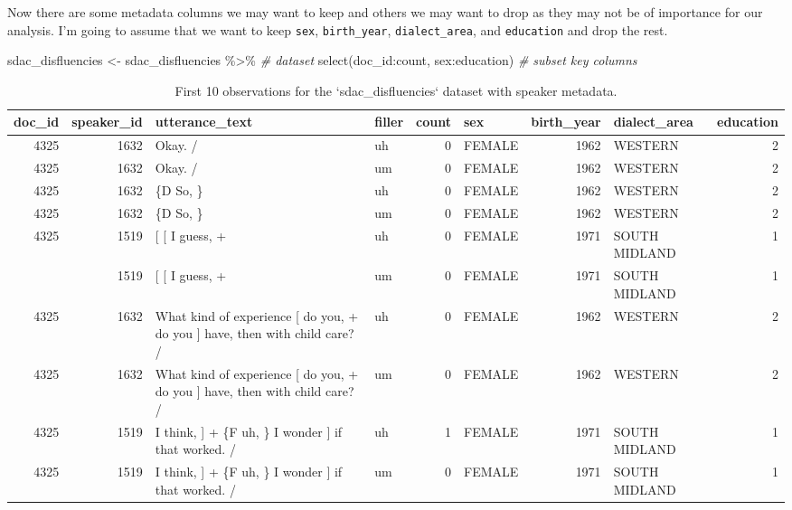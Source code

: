 \documentclass[
]{article}
\newenvironment{Shaded}{\begin{snugshade}}{\end{snugshade}}
\newcommand{\CommentTok}[1]{\textcolor[rgb]{0.56,0.35,0.01}{\textit{#1}}}
\newcommand{\FunctionTok}[1]{\textcolor[rgb]{0.00,0.00,0.00}{#1}}
\newcommand{\NormalTok}[1]{#1}
\newcommand{\OtherTok}[1]{\textcolor[rgb]{0.56,0.35,0.01}{#1}}
\newcommand{\SpecialCharTok}[1]{\textcolor[rgb]{0.00,0.00,0.00}{#1}}
\begin{document}
Now there are some metadata columns we may want to keep and others we may want to drop as they may not be of importance for our analysis. I'm going to assume that we want to keep \texttt{sex}, \texttt{birth\_year}, \texttt{dialect\_area}, and \texttt{education} and drop the rest.

\begin{Shaded}
\begin{Highlighting}[]
\NormalTok{sdac\_disfluencies }\OtherTok{\textless{}{-}} 
\NormalTok{  sdac\_disfluencies }\SpecialCharTok{\%\textgreater{}\%} \CommentTok{\# dataset}
  \FunctionTok{select}\NormalTok{(doc\_id}\SpecialCharTok{:}\NormalTok{count, sex}\SpecialCharTok{:}\NormalTok{education) }\CommentTok{\# subset key columns}
\end{Highlighting}
\end{Shaded}

\begin{table}

\caption{\label{tab:td-sdac-disfluencies-meta-preview}First 10 observations for the `sdac_disfluencies` dataset with speaker metadata.}
\centering
\begin{tabular}[t]{rrllrlrlr}
\toprule
doc\_id & speaker\_id & utterance\_text & filler & count & sex & birth\_year & dialect\_area & education\\
\midrule
4325 & 1632 & Okay.  / & uh & 0 & FEMALE & 1962 & WESTERN & 2\\
4325 & 1632 & Okay.  / & um & 0 & FEMALE & 1962 & WESTERN & 2\\
4325 & 1632 & \{D So, \} & uh & 0 & FEMALE & 1962 & WESTERN & 2\\
4325 & 1632 & \{D So, \} & um & 0 & FEMALE & 1962 & WESTERN & 2\\
4325 & 1519 & {}[ [ I guess, + & uh & 0 & FEMALE & 1971 & SOUTH MIDLAND & 1\\
\addlinespace
4325 & 1519 & {}[ [ I guess, + & um & 0 & FEMALE & 1971 & SOUTH MIDLAND & 1\\
4325 & 1632 & What kind of experience [ do you, + do you ] have, then with child care? / & uh & 0 & FEMALE & 1962 & WESTERN & 2\\
4325 & 1632 & What kind of experience [ do you, + do you ] have, then with child care? / & um & 0 & FEMALE & 1962 & WESTERN & 2\\
4325 & 1519 & I think, ] + \{F uh, \} I wonder ] if that worked. / & uh & 1 & FEMALE & 1971 & SOUTH MIDLAND & 1\\
4325 & 1519 & I think, ] + \{F uh, \} I wonder ] if that worked. / & um & 0 & FEMALE & 1971 & SOUTH MIDLAND & 1\\
\bottomrule
\end{tabular}
\end{table}
\end{document}
